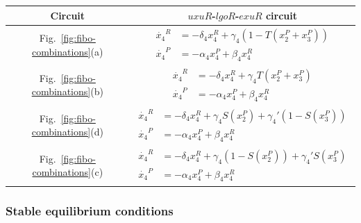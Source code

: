 {
\setlength{\tabcolsep}{10pt}
\renewcommand{\arraystretch}{3.0}
\begin{table}[H]
    \centering
    \vspace{0.2cm}
    \hspace*{-0.75cm}
    \begin{tabular}{|c|c|}
        \hline
        \textbf{Circuit} & \textbf{$uxuR$-$lgoR$-$exuR$ circuit} \\
        \hline
        Fig.~\ref{fig:fibo-combinations}(a) & $\begin{aligned}
            \dot{x_4}^R &= -\delta_4 x_4^R + \gamma_4(1-T(x_2^P+x_3^P))\\
            \dot{x_4}^P &= -\alpha_4 x_4^P + \beta_4 x_4^R
        \end{aligned}$  \\[0.25cm]
        \hline
        Fig.~\ref{fig:fibo-combinations}(b) & $\begin{aligned}
            \dot{x_4}^R &= -\delta_4 x_4^R + \gamma_4 T(x_2^P+x_3^P)\\
            \dot{x_4}^P &= -\alpha_4 x_4^P + \beta_4 x_4^R
        \end{aligned}$  \\[0.25cm]
        \hline
        Fig.~\ref{fig:fibo-combinations}(d) & $\begin{aligned}
            \dot{x_4}^R &= -\delta_4 x_4^R + \gamma_4 S(x_2^P) + \gamma_4'(1 - S(x_3^P))\\
            \dot{x_4}^P &= -\alpha_4 x_4^P + \beta_4 x_4^R
        \end{aligned}$ \\[0.25cm]
        \hline
        Fig.~\ref{fig:fibo-combinations}(c) & $\begin{aligned}
            \dot{x_4}^R &= -\delta_4 x_4^R + \gamma_4(1 - S(x_2^P)) + \gamma_4' S(x_3^P) \\
            \dot{x_4}^P &= -\alpha_4 x_4^P + \beta_4 x_4^R
        \end{aligned}$ \\[0.25cm]
        \hline
    \end{tabular}
\end{table}
}

\subsubsection{Stable equilibrium conditions}

